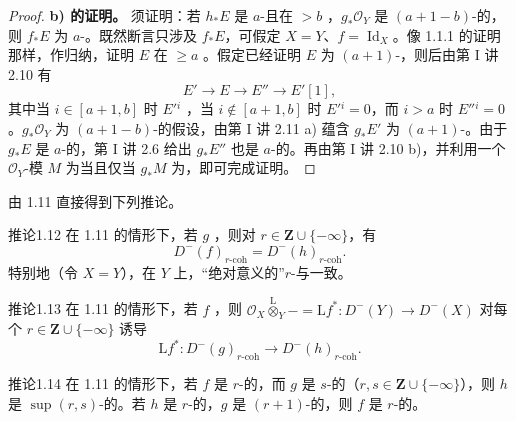 \begin{proof}
\textbf{b) 的证明。} 须证明：若 $h_*E$ 是 $a$-且在 $>b$ ，$g_*\mathcal O_Y$ 是 $(a+1-b)$-的，则 $f_*E$ 为 $a$-。既然断言只涉及 $f_*E$，可假定 $X=Y$、$f=\operatorname{Id}_X$。像 1.1.1 的证明那样，作归纳，证明 $E$ 在 $\ge a$ 。假定已经证明 $E$ 为 $(a+1)$-，则后由第 I 讲 2.10 有
\[E'\longrightarrow E\longrightarrow E''\longrightarrow E'[1],\]
其中当 $i\in[a+1,b]$ 时 $E'{}^i$ ，当 $i\notin[a+1,b]$ 时 $E'{}^i=0$，而 $i>a$ 时 $E''{}^i=0$。$g_*\mathcal O_Y$ 为 $(a+1-b)$-的假设，由第 I 讲 2.11 a) 蕴含 $g_*E'$ 为 $(a+1)$-。由于 $g_*E$ 是 $a$-的，第 I 讲 2.6 给出 $g_*E''$ 也是 $a$-的。再由第 I 讲 2.10 b)，并利用一个 $\mathcal O_Y$-模 $M$ 为当且仅当 $g_*M$ 为，即可完成证明。
\end{proof}
由 1.11 直接得到下列推论。
\begin{SGAresult}{推论}{1.12}
在 1.11 的情形下，若 $g$ ，则对 $r\in\mathbf Z\cup\{-\infty\}$，有
\[D^-(f)_{r\text{-coh}}=D^-(h)_{r\text{-coh}}.\]
特别地（令 $X=Y$），在 $Y$ 上，“绝对意义的”$r$-与一致。
\end{SGAresult}
\begin{SGAresult}{推论}{1.13}
在 1.11 的情形下，若 $f$ ，则 $\mathcal O_X\mathbin{\overset{\mathrm L}{\otimes}}_Y- =\mathrm Lf^*:D^-(Y)\to D^-(X)$ 对每个 $r\in\mathbf Z\cup\{-\infty\}$ 诱导
\[\mathrm Lf^*:D^-(g)_{r\text{-coh}}\longrightarrow D^-(h)_{r\text{-coh}}.\]
\end{SGAresult}
\begin{SGAresult}{推论}{1.14}
在 1.11 的情形下，若 $f$ 是 $r$-的，而 $g$ 是 $s$-的（$r,s\in\mathbf Z\cup\{-\infty\}$），则 $h$ 是 $\sup(r,s)$-的。若 $h$ 是 $r$-的，$g$ 是 $(r+1)$-的，则 $f$ 是 $r$-的。
\end{SGAresult}
